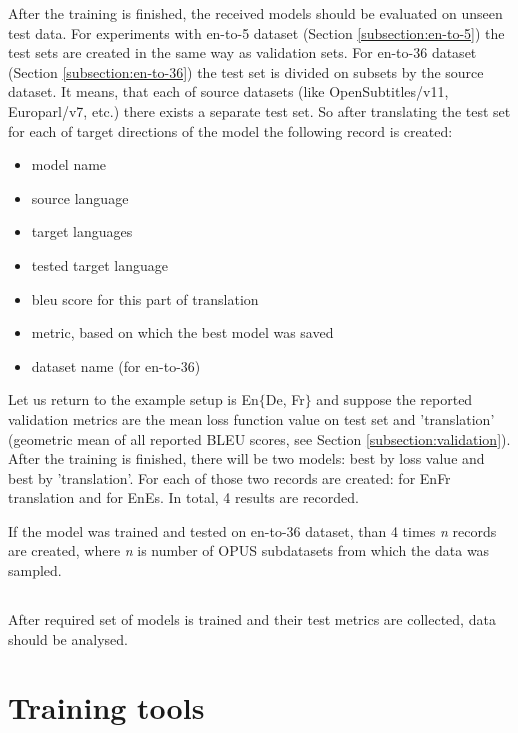 After the training is finished, the received models should be evaluated on unseen
test data.
For experiments with \gls{en-to-5} dataset (Section \ref{subsection:en-to-5})
the test sets are created in the same way as validation sets.
For \gls{en-to-36} dataset (Section \ref{subsection:en-to-36})
the test set is divided on subsets by the source dataset.
It means, that each of source datasets (like OpenSubtitles/v11, 
Europarl/v7, etc.) there exists a separate test set.
So after translating the test set for each of target directions of the model
the following record is created:
\begin{itemize}
	\item model name
	\item source language
	\item target languages
	\item tested target language
	\item \acrshort{bleu} score for this part of translation
	\item metric, based on which the best model was saved
	\item dataset name (for \gls{en-to-36})
\end{itemize}

Let us return to the example setup is En\to{}$\{$De, Fr$\}$ and
suppose the reported validation metrics are the mean loss function value on
test set and 'translation' (geometric mean of all reported BLEU scores,
see Section \ref{subsection:validation}).
After the training is finished, there will be two models: best by
loss value and best by 'translation'.
For each of those two records are created: for En\to{}Fr translation
and for En\to{}Es. In total, 4 results are recorded.

If the model was trained and tested on \gls{en-to-36} dataset,
than 4 times \textit{n} records are created, where \textit{n}
is number of OPUS subdatasets from which the data was sampled.


\subsection{}

After required set of models is trained and their test
metrics are collected, data should be analysed.





\section{Training tools}

